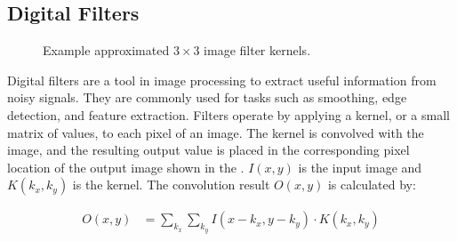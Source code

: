 \subsection{Digital Filters}
\begin{figure}[h]
\centering
{}
\hfill
{}%
\hfill
{}%
\caption{Example approximated $3\times3$ image filter kernels.}
\label{fig:filter-kernels}
\end{figure}


Digital filters are a tool in image processing to extract useful information from noisy signals. They are commonly used for tasks such as smoothing, edge detection, and feature extraction. Filters operate by applying a kernel, or a small matrix of values, to each pixel of an image. The kernel is convolved with the image, and the resulting output value is placed in the corresponding pixel location of the output image shown in the . $I(x,y)$ is the input image and $K(k_x,k_y)$ is the kernel. The convolution result $O(x,y)$ is calculated by:  

\begin{equation}\label{eq:kernel}
\begin{aligned}
O(x, y) &= \sum_{k_x} \sum_{k_y} I(x - k_x, y - k_y) \cdot K(k_x, k_y)
\end{aligned}
\end{equation}

